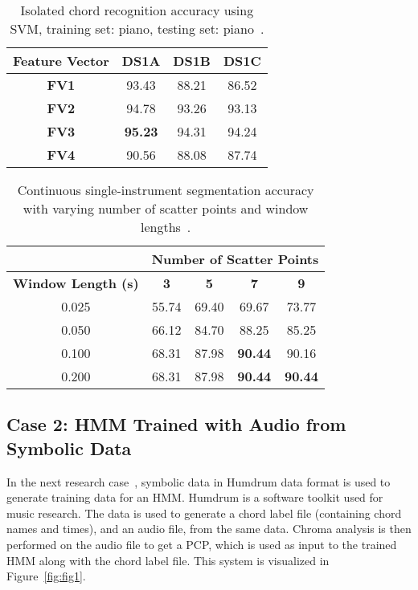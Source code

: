 \documentclass{sig-alternate}
\begin{document}
\begin{table}
\centering
\begin{tabular}{|c|c|c|c|} \hline
\textbf{Feature Vector} & \textbf{DS1A} & \textbf{DS1B} & \textbf{DS1C} \\ \hline
\textbf{FV1} & 93.43 & 88.21 & 86.52 \\ \hline
\textbf{FV2} & 94.78 & 93.26 & 93.13 \\ \hline
\textbf{FV3} & \textbf{95.23} & 94.31 & 94.24 \\ \hline
\textbf{FV4} & 90.56 & 88.08 & 87.74 \\ \hline
\end{tabular}
\caption{Isolated chord recognition accuracy using SVM, training set: piano, testing set: piano~\cite{Morman:2006}.}
\label{tab:tab7}
\end{table}

\begin{table}
\centering
\begin{tabular}{|c|c|c|c|c|} \hline
&\multicolumn{4}{|c|}{\textbf{Number of Scatter Points}} \\ \hline
\textbf{Window Length (s)} & \textbf{3} & \textbf{5} & \textbf{7} & \textbf{9} \\ \hline
0.025 & 55.74 & 69.40 & 69.67 & 73.77 \\ \hline
0.050 & 66.12 & 84.70 & 88.25 & 85.25 \\ \hline
0.100 & 68.31 & 87.98 & \textbf{90.44} & 90.16 \\ \hline
0.200 & 68.31 & 87.98 & \textbf{90.44} & \textbf{90.44} \\ \hline
\end{tabular}
\caption{Continuous single-instrument segmentation accuracy with varying number of scatter points and window lengths~\cite{Morman:2006}.}
\label{tab:tab8}
\end{table}

\subsection{Case 2: HMM Trained with Audio from Symbolic Data}

In the next research case~\cite{Lee:2006}, symbolic data in Humdrum data format is used to generate training data for an HMM. Humdrum is a software toolkit used for music research. The data is used to generate a chord label file (containing chord names and times), and an audio file, from the same data. Chroma analysis is then performed on the audio file to get a PCP, which is used as input to the trained HMM along with the chord label file. This system is visualized in Figure~\ref{fig:fig1}.
\end{document}
